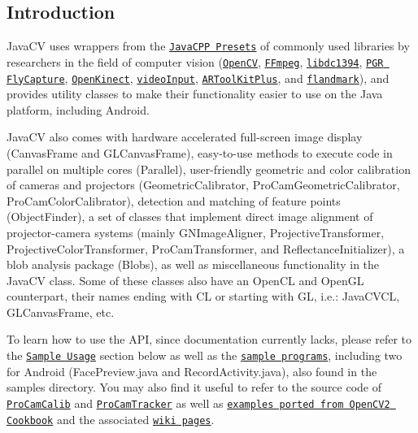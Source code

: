 \subsection*{Introduction }

Java\+C\+V uses wrappers from the \href{https://github.com/bytedeco/javacpp-presets}{\tt Java\+C\+P\+P Presets} of commonly used libraries by researchers in the field of computer vision (\href{http://opencv.org/}{\tt Open\+C\+V}, \href{http://ffmpeg.org/}{\tt F\+Fmpeg}, \href{http://damien.douxchamps.net/ieee1394/libdc1394/}{\tt libdc1394}, \href{http://www.ptgrey.com/products/pgrflycapture/}{\tt P\+G\+R Fly\+Capture}, \href{http://openkinect.org/}{\tt Open\+Kinect}, \href{http://muonics.net/school/spring05/videoInput/}{\tt video\+Input}, \href{http://studierstube.icg.tugraz.at/handheld_ar/artoolkitplus.php}{\tt A\+R\+Tool\+Kit\+Plus}, and \href{http://cmp.felk.cvut.cz/~uricamic/flandmark/}{\tt flandmark}), and provides utility classes to make their functionality easier to use on the Java platform, including Android.

Java\+C\+V also comes with hardware accelerated full-\/screen image display ({\ttfamily Canvas\+Frame} and {\ttfamily G\+L\+Canvas\+Frame}), easy-\/to-\/use methods to execute code in parallel on multiple cores ({\ttfamily Parallel}), user-\/friendly geometric and color calibration of cameras and projectors ({\ttfamily Geometric\+Calibrator}, {\ttfamily Pro\+Cam\+Geometric\+Calibrator}, {\ttfamily Pro\+Cam\+Color\+Calibrator}), detection and matching of feature points ({\ttfamily Object\+Finder}), a set of classes that implement direct image alignment of projector-\/camera systems (mainly {\ttfamily G\+N\+Image\+Aligner}, {\ttfamily Projective\+Transformer}, {\ttfamily Projective\+Color\+Transformer}, {\ttfamily Pro\+Cam\+Transformer}, and {\ttfamily Reflectance\+Initializer}), a blob analysis package ({\ttfamily Blobs}), as well as miscellaneous functionality in the {\ttfamily Java\+C\+V} class. Some of these classes also have an Open\+C\+L and Open\+G\+L counterpart, their names ending with {\ttfamily C\+L} or starting with {\ttfamily G\+L}, i.\+e.\+: {\ttfamily Java\+C\+V\+C\+L}, {\ttfamily G\+L\+Canvas\+Frame}, etc.

To learn how to use the A\+P\+I, since documentation currently lacks, please refer to the \href{#sample-usage}{\tt Sample Usage} section below as well as the \href{https://github.com/bytedeco/javacv/tree/master/samples/}{\tt sample programs}, including two for Android ({\ttfamily Face\+Preview.\+java} and {\ttfamily Record\+Activity.\+java}), also found in the {\ttfamily samples} directory. You may also find it useful to refer to the source code of \href{https://github.com/bytedeco/procamcalib}{\tt Pro\+Cam\+Calib} and \href{https://github.com/bytedeco/procamtracker}{\tt Pro\+Cam\+Tracker} as well as \href{https://github.com/bytedeco/javacv-examples/}{\tt examples ported from Open\+C\+V2 Cookbook} and the associated \href{http://code.google.com/p/javacv/wiki/OpenCV2_Cookbook_Examples}{\tt wiki pages}.

